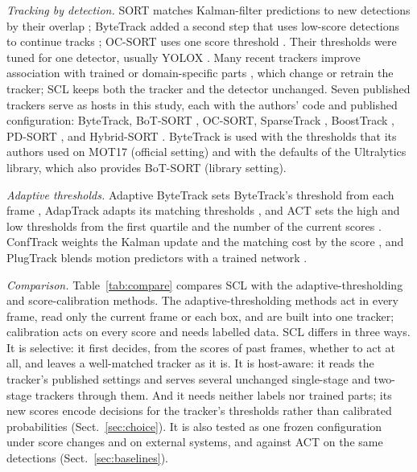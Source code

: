 \documentclass[pdflatex,sn-mathphys-num,iicol]{sn-jnl}
\makeatletter
\newcommand{\scl}{SCL}
\renewcommand\subsection{\@startsection{subsection}{2}{\z@}{-9pt \@plus -3pt \@minus -2pt}{4pt}{\subsectionfont}}
\makeatother
\begin{document}
\subsection{Related work}\label{sec:survey}
\emph{Tracking by detection.}\label{sec:hosts} SORT matches Kalman-filter predictions to new
detections by their overlap \cite{bewley2016sort}; ByteTrack added a second step that uses
low-score detections to continue tracks \cite{zhang2022bytetrack}; OC-SORT uses one score
threshold \cite{cao2023ocsort}. Their thresholds were tuned for one detector, usually YOLOX
\cite{ge2021yolox}. Many recent trackers improve association with trained or domain-specific
parts \cite{li2024fdbtrack,bao2024graphmatching,zhang2025sinkhorn,ding2025remot,liang2024motiontrack,sun2026bsr},
which change or retrain the tracker; \scl{} keeps both the tracker and the detector unchanged.
Seven published trackers serve as hosts in this study, each with the authors' code and published
configuration: ByteTrack, BoT-SORT \cite{aharon2022botsort}, OC-SORT, SparseTrack
\cite{liu2025sparsetrack}, BoostTrack \cite{stanojevic2024boosttrack}, PD-SORT
\cite{wang2025pdsort}, and Hybrid-SORT \cite{yang2024hybridsort}. ByteTrack is used with the
thresholds that its authors used on MOT17 (official setting) and with the defaults of the
Ultralytics library, which also provides BoT-SORT (library setting).

\emph{Adaptive thresholds.} Adaptive ByteTrack sets ByteTrack's threshold from each frame
\cite{ma2023adaptivebytetrack}, AdapTrack adapts its matching thresholds \cite{shim2024adaptrack},
and ACT sets the high and low thresholds from the first quartile and the number of the current
scores \cite{act2026adaptive}. ConfTrack weights the Kalman update and the matching cost by the
score \cite{jung2024conftrack}, and PlugTrack blends motion predictors with a trained network
\cite{kim2026plugtrack}.

\emph{Comparison.} Table~\ref{tab:compare} compares \scl{} with the adaptive-thresholding and
score-calibration methods. The adaptive-thresholding methods act in every frame, read only the
current frame or each box, and are built into one tracker; calibration acts on every score and
needs labelled data. \scl{} differs in three ways. It is selective: it first decides, from the
scores of past frames, whether to act at all, and leaves a well-matched tracker as it is. It is
host-aware: it reads the tracker's published settings and serves several unchanged single-stage
and two-stage trackers through them. And it needs neither labels nor trained parts; its new scores
encode decisions for the tracker's thresholds rather than calibrated probabilities
(Sect.~\ref{sec:choice}). It is also tested as one frozen configuration under score changes and on
external systems, and against ACT on the same detections (Sect.~\ref{sec:baselines}).
\end{document}

